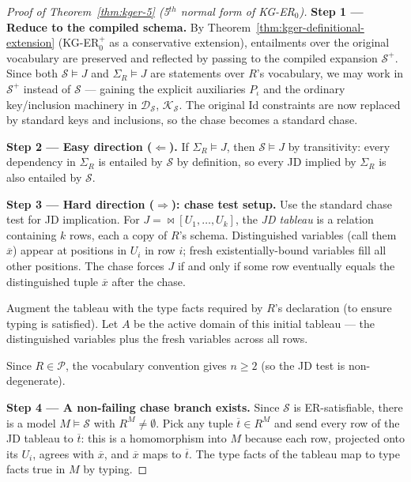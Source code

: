 \documentclass[10pt]{article}
\begin{document}
\begin{proof}[Proof of Theorem~\ref{thm:kger-5} (5$^{th}$ normal form of KG-ER$_0$)]

\smallskip\noindent\textbf{Step 1 --- Reduce to the compiled schema.}
By Theorem~\ref{thm:kger-definitional-extension} (KG-ER\(_0^+\) as a
conservative extension), entailments over the original vocabulary are
preserved and reflected by passing to the compiled expansion
\(\mathcal S^+\).  Since both \(\mathcal S\models J\) and
\(\Sigma_R\models J\) are statements over \(R\)'s vocabulary, we may
work in \(\mathcal S^+\) instead of \(\mathcal S\) --- gaining the
explicit auxiliaries \(P_\iota\) and the ordinary key/inclusion
machinery in \(\mathcal D_{\mathcal S}\), \(\mathcal K_{\mathcal S}\).
The original Id constraints are now replaced by standard keys and
inclusions, so the chase becomes a standard chase.

\smallskip\noindent\textbf{Step 2 --- Easy direction (\(\Leftarrow\)).}
If \(\Sigma_R\models J\), then \(\mathcal S\models J\) by transitivity:
every dependency in \(\Sigma_R\) is entailed by \(\mathcal S\) by
definition, so every JD implied by \(\Sigma_R\) is also entailed by
\(\mathcal S\).

\smallskip\noindent\textbf{Step 3 --- Hard direction
(\(\Rightarrow\)): chase test setup.}
Use the standard chase test for JD implication.  For
\(J=\bowtie[U_1,\ldots,U_k]\), the \emph{JD tableau} is a relation
containing \(k\) rows, each a copy of \(R\)'s schema.  Distinguished
variables (call them \(\overline{x}\)) appear at positions in \(U_i\)
in row \(i\); fresh existentially-bound variables fill all other
positions.  The chase forces \(J\) if and only if some row eventually
equals the distinguished tuple \(\overline{x}\) after the chase.

Augment the tableau with the type facts required by \(R\)'s
declaration (to ensure typing is satisfied).  Let \(A\) be the active
domain of this initial tableau --- the distinguished variables plus
the fresh variables across all rows.

Since \(R\in\mathcal P\), the vocabulary convention gives \(n\geq 2\)
(so the JD test is non-degenerate).

\smallskip\noindent\textbf{Step 4 --- A non-failing chase branch
exists.}
Since \(\mathcal S\) is ER-satisfiable, there is a model
\(M\models\mathcal S\) with \(R^M\neq\emptyset\).  Pick any tuple
\(\overline{t}\in R^M\) and send every row of the JD tableau to
\(\overline{t}\): this is a homomorphism into \(M\) because each row,
projected onto its \(U_i\), agrees with \(\overline{x}\), and
\(\overline{x}\) maps to \(\overline{t}\).  The type facts of the
tableau map to type facts true in \(M\) by typing.


\end{proof}
\end{document}
